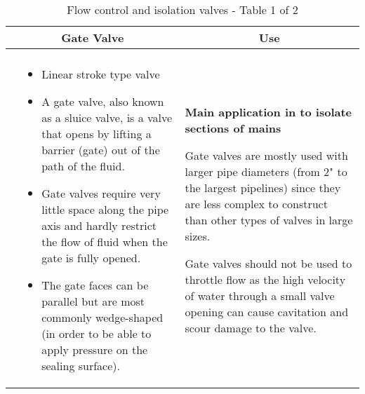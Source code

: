 \begin{landscape}
\begin{table}
\begin{tabular}{| m{7cm} m{10cm} | m{7cm} | }
    \\ \hline
\multicolumn{2}{c}{Gate Valve} & \multicolumn{1}{c}{Use}\\ \hline
    \begin{minipage}{.3\textwidth}
   \vspace{-2em} 
     \texttt{[image: GateValve2.png]}\\
    \end{minipage}
    &
            \vspace{0.7cm}
  \scriptsize{\begin{itemize}[topsep=5pt, partopsep=0pt]
  \item Linear stroke type valve \item A gate valve, also known as a sluice valve, is a valve that opens by lifting a barrier (gate) out of the path of the fluid. \item Gate valves require very little space along the pipe axis and hardly restrict the flow of fluid when the gate is fully opened. \item The gate faces can be parallel but are most commonly wedge-shaped (in order to be able to apply pressure on the sealing surface).
  \end{itemize}}  
    &
        \vspace{0.4cm}
      \begin{itemize}[leftmargin=*]
      \scriptsize{
        \item \textbf{Main application in to isolate sections of mains}
        \item Gate valves are mostly used with larger pipe diameters (from 2" to the largest pipelines) since they are less complex to construct than other types of valves in large sizes. \item Gate valves should not be used to throttle flow as the high velocity of water through a small valve opening can cause cavitation and scour damage to the valve. }
      \end{itemize}
  
    \\ \hline
   \end{tabular}
\caption{Flow control and isolation valves - Table 1 of 2}
   \label{table:Valve1}  
\end{table}

\end{landscape}

